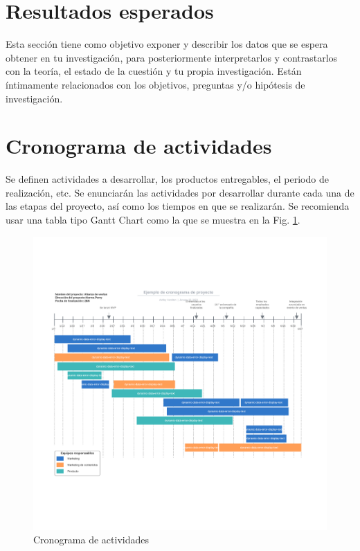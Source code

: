 \documentclass[letterpaper,12pt,oneside]{article}
\begin{document}
\section{Resultados esperados}
Esta sección tiene como objetivo exponer y describir los datos que se espera obtener en tu investigación, para posteriormente interpretarlos y contrastarlos con la teoría, el estado de la cuestión y tu propia investigación. Están íntimamente relacionados con los objetivos, preguntas y/o hipótesis de investigación. 

\section{Cronograma de actividades} 
Se definen actividades a desarrollar, los productos entregables, el periodo de realización, etc. Se enunciarán las actividades por desarrollar durante cada una de las etapas del proyecto, así como los tiempos en que se realizarán. Se recomienda usar una tabla tipo Gantt Chart como la que se muestra en la Fig. \ref{fig:cron}.

\begin{figure}[h]
    \centering
    \includegraphics[scale=0.4]{cronograma.png} %
    \caption{Cronograma de actividades}
    \label{fig:cron}
\end{figure}

\clearpage
\end{document}
